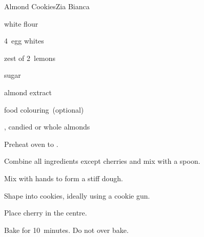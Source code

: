 \begin{recipe}{Almond Cookies}{Zia Bianca}{}

\begin{ingredients}
\item {} white  flour
\item 4~egg whites
\item zest of 2~lemons
\item {} sugar
\item \tp{\half} almond extract
\item food colouring~(optional)
\item {}, candied or whole almonds
\end{ingredients}

\begin{directions}
\item Preheat oven to .
\item Combine all ingredients except cherries and mix with a spoon.
\item Mix with hands to form a stiff dough.
\item Shape into cookies, ideally using a cookie gun.
\item Place cherry in the centre.
\item Bake for 10~minutes. Do not over bake.
\end{directions}

\end{recipe}
